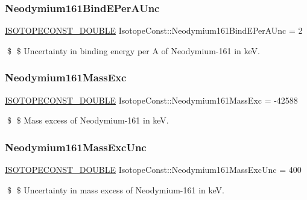 \subsubsection{\texorpdfstring{Neodymium161\+Bind\+E\+Per\+A\+Unc}{Neodymium161BindEPerAUnc}}
{\footnotesize\ttfamily \mbox{\hyperlink{group___isotope_const-_macros_ga8f45a7272ce02c0b4c65c44636ed719a}{I\+S\+O\+T\+O\+P\+E\+C\+O\+N\+S\+T\+\_\+\+D\+O\+U\+B\+LE}} Isotope\+Const\+::\+Neodymium161\+Bind\+E\+Per\+A\+Unc = 2}

\$ \$ Uncertainty in binding energy per A of Neodymium-\/161 in keV. \mbox{\label{group___isotope_const-_neodymium-_nd161_ga1b6e3dd52a26cd768c4b1df06ff92725}} 
\subsubsection{\texorpdfstring{Neodymium161\+Mass\+Exc}{Neodymium161MassExc}}
{\footnotesize\ttfamily \mbox{\hyperlink{group___isotope_const-_macros_ga8f45a7272ce02c0b4c65c44636ed719a}{I\+S\+O\+T\+O\+P\+E\+C\+O\+N\+S\+T\+\_\+\+D\+O\+U\+B\+LE}} Isotope\+Const\+::\+Neodymium161\+Mass\+Exc = -\/42588}

\$ \$ Mass excess of Neodymium-\/161 in keV. \mbox{\label{group___isotope_const-_neodymium-_nd161_ga4c585fe43ba3cb38960ebfc87d743387}} 
\subsubsection{\texorpdfstring{Neodymium161\+Mass\+Exc\+Unc}{Neodymium161MassExcUnc}}
{\footnotesize\ttfamily \mbox{\hyperlink{group___isotope_const-_macros_ga8f45a7272ce02c0b4c65c44636ed719a}{I\+S\+O\+T\+O\+P\+E\+C\+O\+N\+S\+T\+\_\+\+D\+O\+U\+B\+LE}} Isotope\+Const\+::\+Neodymium161\+Mass\+Exc\+Unc = 400}

\$ \$ Uncertainty in mass excess of Neodymium-\/161 in keV. \mbox{\label{group___isotope_const-_neodymium-_nd161_gafa066f0f43d39bf1ea6bc68bae5fb092}} 
